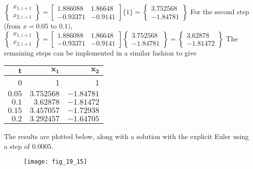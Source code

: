 \documentclass[../main.tex]{subfiles}
\begin{document}
\begin{enumerate}[label=\bfseries(\alph*)]
\begin{blockquote}
\end{blockquote}
	\bigbreak
$
\left\{\begin{array}{l}
x_{1, i+1} \\
x_{2, i+1}
\end{array}\right\}=\left[\begin{array}{cc}
1.886088 & 1.86648 \\
-0.93371 & -0.9141
\end{array}\right]\{1\}=\left\{\begin{array}{c}
3.752568 \\
-1.84781
\end{array}\right\}
$
	\bigbreak
For the second step (from $x=0.05$ to $0.1)$,
	\bigbreak
$
\left\{\begin{array}{l}
x_{1, i+1} \\
x_{2, i+1}
\end{array}\right\}=\left[\begin{array}{cc}
1.886088 & 1.86648 \\
-0.93371 & -0.9141
\end{array}\right]\left\{\begin{array}{c}
3.752568 \\
-1.84781
\end{array}\right\}=\left\{\begin{array}{c}
3.62878 \\
-1.81472
\end{array}\right\}
$
	\bigbreak
The remaining steps can be implemented in a similar fashion to give
	\bigbreak
\begin{tabular}{rrr}
\hline
$\boldsymbol{t}$ & $\boldsymbol{x}_{\mathbf{1}}$ & $\boldsymbol{x}_{\mathbf{2}}$ \\
\hline
0 & 1 & 1 \\
$0.05$ & $3.752568$ & $-1.84781$ \\
$0.1$ & $3.62878$ & $-1.81472$ \\
$0.15$ & $3.457057$ & $-1.72938$ \\
$0.2$ & $3.292457$ & $-1.64705$ \\
\hline
\end{tabular}
	\bigbreak
The results are plotted below, along with a solution with the explicit Euler using a step of $0.0005$.
	\bigbreak
	\begin{figure}[H]
		\texttt{[image: fig\_19\_15]}
		\label{fig:fig_19_15}
	\end{figure}
	\bigbreak
\end{enumerate}
\end{document}
